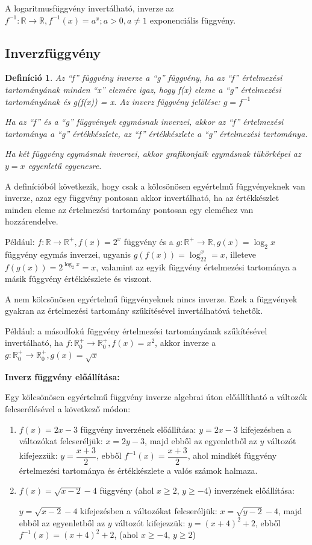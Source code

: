 \documentclass[12pt,a4paper]{article}
\newtheorem{definition}{Definíció} [section]
\begin{document}
A logaritmusfüggvény invertálható, inverze az $f^{-1}:\mathbb{R}\rightarrow \mathbb{R}, f^{-1}(x)=a^x; a>0, a\neq 1$ exponenciális függvény.

\subsection{Inverzfüggvény}
\begin{definition}
Az ``f'' függvény inverze a ``g'' függvény, ha az ``f'' értelmezési tartományának minden ``x'' elemére igaz, hogy f(x) eleme a ``g'' értelmezési tartományának és g(f(x)) = x. Az inverz függvény jelölése: $g=f^{-1}$

Ha az ``f'' és a ``g'' függvények egymásnak inverzei, akkor az ``f'' értelmezési tartománya a ``g'' értékkészlete, az ``f'' értékkészlete a ``g'' értelmezési tartománya.

Ha két függvény egymásnak inverzei, akkor grafikonjaik egymásnak tükörképei az $y = x$ egyenletű egyenesre.
\end{definition}

A definícióból következik, hogy csak a kölcsönösen egyértelmű függvényeknek van inverze, azaz egy függvény pontosan akkor invertálható, ha az értékkészlet minden eleme az értelmezési tartomány pontosan egy eleméhez van hozzárendelve.

Például: $f:\mathbb{R}\rightarrow\mathbb{R}^+, f(x)=2^x$ függvény és a $g:\mathbb{R}^+\rightarrow\mathbb{R}, g(x)=\log_2x$ függvény egymás inverzei, ugyanis $g(f(x))=\log_22^x=x$, illeteve $f(g(x))=2^{\log_2x}=x$, valamint az egyik függvény értelmezési tartománya a másik függvény értékkészlete és viszont.

A nem kölcsönösen egyértelmű függvényeknek nincs inverze. Ezek a függvények gyakran az értelmezési tartomány szűkítésével invertálhatóvá tehetők.

Például: a másodfokú függvény értelmezési tartományának szűkítésével invertálható, ha $f:\mathbb{R}_0^+\rightarrow\mathbb{R}^+_0, f(x)=x^2$, akkor inverze a $g:\mathbb{R}^+_0\rightarrow\mathbb{R}^+_0, g(x)=\sqrt{x}$

\vspace{30px}
\textbf{Inverz függvény előállítása:}

Egy kölcsönösen egyértelmű függvény inverze algebrai úton előállítható a változók felcserélésével
a következő módon:
\begin{enumerate}
\item $f(x)=2x-3$ függvény inverzének előállítása: $y=2x-3$ kifejezésben a változókat felcseréljük: $x=2y-3$, majd ebből az egyenletből az $y$ változót kifejezzük: $y=\dfrac{x+3}{2}$, ebből $f^{-1}(x)=\dfrac{x+3}{2}$, ahol mindkét függvény értelmezési tartománya és értékkészlete a valós számok halmaza.
\item $f(x)=\sqrt{x-2}-4$ függvény (ahol $x \geq 2$, $y \geq -4$) inverzének előállítása:

$y=\sqrt{x-2}-4$ kifejezésben a változókat felcseréljük: $x=\sqrt{y-2}-4$, majd ebből az egyenletből az $y$ változót kifejezzük: $y=(x+4)^2+2$, ebből $f^{-1}(x)=(x+4)^2+2$, (ahol $x \geq -4$, $y \geq 2$)
\end{enumerate}
\end{document}
